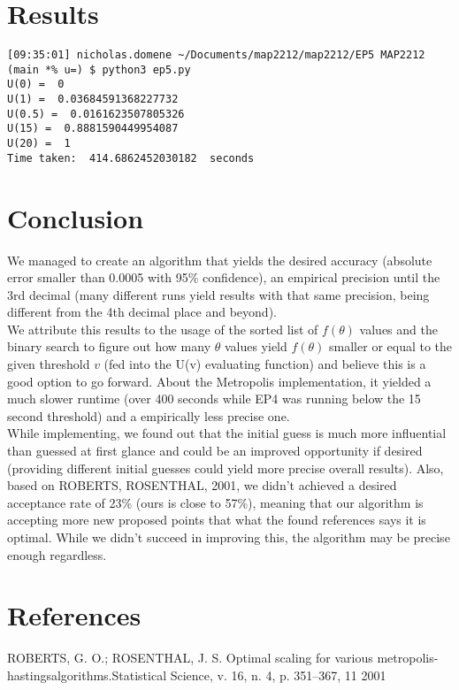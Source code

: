 \documentclass[12pt]{article}
\begin{document}
\section*{Results}
\begin{lstlisting}
[09:35:01] nicholas.domene ~/Documents/map2212/map2212/EP5 MAP2212 (main *% u=) $ python3 ep5.py 
U(0) =  0
U(1) =  0.03684591368227732
U(0.5) =  0.0161623507805326
U(15) =  0.8881590449954087
U(20) =  1
Time taken:  414.6862452030182  seconds
\end{lstlisting}
\section*{Conclusion}
We managed to create an algorithm that yields the desired accuracy (absolute error smaller than 0.0005 with 95\% confidence), an empirical precision until the 3rd decimal (many different runs yield results with that same precision, being different from the 4th decimal place and beyond). \\
We attribute this results to the usage of the sorted list of $f(\theta)$ values and the binary search to figure out how many $\theta$ values yield $f(\theta)$ smaller or equal to the given threshold $v$ (fed into the U(v) evaluating function) and believe this is a good option to go forward.
About the Metropolis implementation, it yielded a much slower runtime (over 400 seconds while EP4 was running below the 15 second threshold) and a empirically less precise one.\\
While implementing, we found out that the initial guess is much more influential than guessed at first glance and could be an improved opportunity if desired (providing different initial guesses could yield more precise overall results). Also, based on ROBERTS, ROSENTHAL, 2001, we didn't achieved a desired acceptance rate of 23\% (ours is close to 57\%), meaning that our algorithm is accepting more new proposed points that what the found references says it is optimal. While we didn't succeed in improving this, the algorithm may be precise enough regardless.

\section*{References}
ROBERTS, G. O.; ROSENTHAL, J. S. Optimal scaling for various metropolis-hastingsalgorithms.Statistical Science, v. 16, n. 4, p. 351–367, 11 2001
\end{document}
